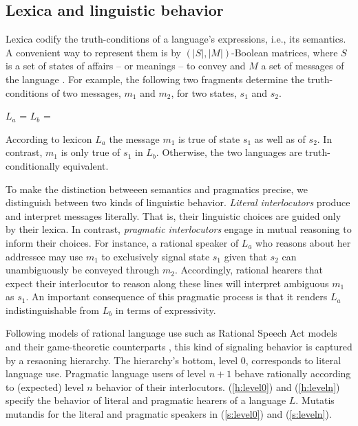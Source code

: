 \documentclass[a4paper]{article}
\begin{document}
\subsection{Lexica and linguistic behavior}
Lexica codify the truth-conditions of a language's expressions, i.e., its semantics. A convenient way to represent them is by $(|S|,|M|)$-Boolean matrices, where $S$ is a set of states of affairs -- or meanings -- to convey and $M$ a set of messages of the language \citep{franke+jaeger:2014}. For example, the following two fragments determine the truth-conditions of two messages, $m_1$ and $m_2$, for two states, $s_1$ and $s_2$.

\begin{centering}
$L_a$ =  \hspace{2cm} $L_b$ = \\[0.5cm]
\end{centering}


According to lexicon $L_a$ the message $m_1$ is true of state $s_1$ as well as of $s_2$. In contrast, $m_1$ is only true of $s_1$ in $L_b$. Otherwise, the two languages are truth-conditionally equivalent. 

To make the distinction betweeen semantics and pragmatics precise, we distinguish between two kinds of linguistic behavior. {\em Literal interlocutors} produce and interpret messages literally. That is, their linguistic choices are guided only by their lexica. In contrast, {\em pragmatic interlocutors} engage in mutual reasoning to inform their choices. For instance, a rational speaker of $L_a$ who reasons about her addressee may use $m_1$ to exclusively signal state $s_1$ given that $s_2$ can unambiguously be conveyed through $m_2$. Accordingly, rational hearers that expect their interlocutor to reason along these lines will interpret ambiguous $m_1$ as $s_1$. An important consequence of this pragmatic process is that it renders $L_a$ indistinguishable from $L_b$ in terms of expressivity. 

Following models of rational language use such as Rational Speech Act models \citep{frank+goodman:2012} and their game-theoretic counterparts \citep{benz+etal:2005a,franke:2009,franke+jaeger:2014}, this kind of signaling behavior is captured by a resaoning hierarchy. The hierarchy's bottom, level $0$, corresponds to literal language use. Pragmatic language users of level $n + 1$ behave rationally according to (expected) level $n$ behavior of their interlocutors. (\ref{h:level0}) and (\ref{h:leveln}) specify the behavior of literal and pragmatic hearers of a language $L$. Mutatis mutandis for the literal and pragmatic speakers in (\ref{s:level0}) and (\ref{s:leveln}).
\end{document}
